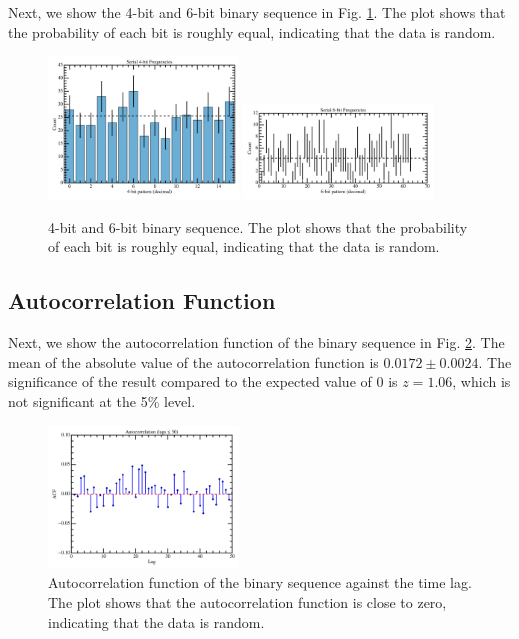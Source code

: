 Next, we show the 4-bit and 6-bit binary sequence in Fig. \ref{fig:serial_4bit_6bit}. The plot shows that the probability of each bit is roughly equal, indicating that the data is random.
\begin{figure}
\centering
\includegraphics[width=0.45\textwidth]{figure/serial4.png}
\includegraphics[width=0.45\textwidth]{figure/serial6.png}
\caption{4-bit and 6-bit binary sequence. The plot shows that the probability of each bit is roughly equal, indicating that the data is random.}
\label{fig:serial_4bit_6bit}
\end{figure}


\subsection{Autocorrelation Function}
Next, we show the autocorrelation function of the binary sequence in Fig. \ref{fig:autocorrelation}. The mean of the absolute value of the autocorrelation function is $0.0172 \pm 0.0024$. The significance of the result compared to the expected value of 0 is $z=1.06$, which is not significant at the 5\% level. 
\begin{figure}
\centering
\includegraphics[width=0.45\textwidth]{figure/acf_bits.png}
\caption{Autocorrelation function of the binary sequence against the time lag. The plot shows that the autocorrelation function is close to zero, indicating that the data is random.}
\label{fig:autocorrelation}
\end{figure}

